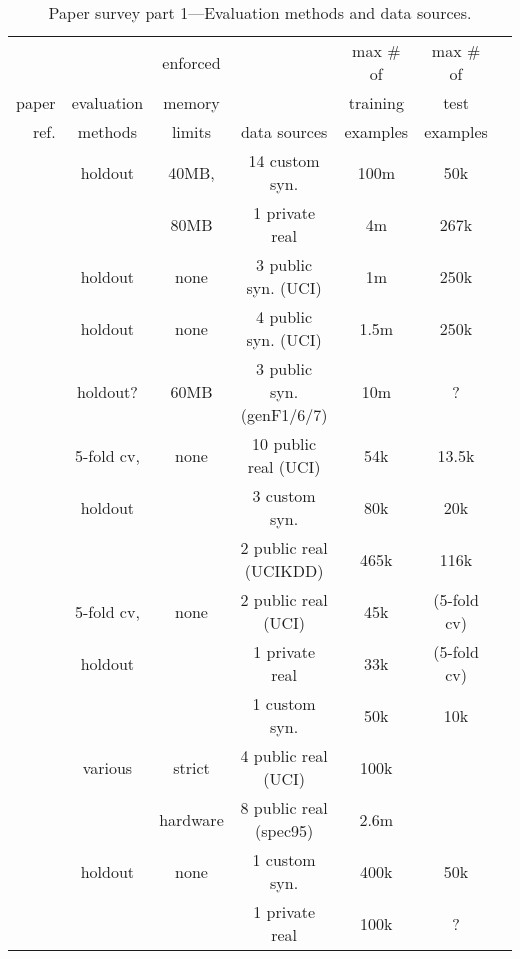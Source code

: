 \begin{table}
\caption{Paper survey part 1---Evaluation methods and data sources.}
\centering
\footnotesize
\begin{tabular}{|r|c|c|c|c|c|c|}
\hline											
	&		&	enforced	&		&	max \# of	&	max \# of	\\
paper	&	evaluation	&	memory	&		&	training	&	test	\\
ref.	&	methods	&	limits	&	data sources	&	examples	&	examples	\\
\hline											
\cite{vfdt}	&	holdout	&	40MB,	&	14 custom syn.	&	100m	&	50k	\\
	&		&	80MB	&	1 private real	&	4m	&	267k	\\
\hline											
\cite{vfdtc}	&	holdout	&	none	&	3 public syn. (UCI)	&	1m	&	250k	\\
\hline											
\cite{ufft}	&	holdout	&	none	&	4 public syn. (UCI)	&	1.5m	&	250k	\\
\hline											
\cite{nip}	&	holdout?	&	60MB	&	3 public syn. (genF1/6/7)	&	10m	&	?	\\
\hline											
\cite{ozaexp}	&	5-fold cv,	&	none	&	10 public real (UCI)	&	54k	&	13.5k	\\
	&	holdout	&		&	3 custom syn.	&	80k	&	20k	\\
	&		&		&	2 public real (UCIKDD)	&	465k	&	116k	\\
\hline											
\cite{sea}	&	5-fold cv,	&	none	&	2 public real (UCI)	&	45k	&	(5-fold cv)	\\
	&	holdout	&		&	1 private real	&	33k	&	(5-fold cv)	\\
	&		&		&	1 custom syn.	&	50k	&	10k	\\
\hline											
\cite{branchpred}	&	various	&	strict	&	4 public real (UCI)	&	100k	&		\\
	&		&	hardware	&	8 public real (spec95)	&	2.6m	&		\\
\hline											
\cite{fastlightboost}	&	holdout	&	none	&	1 custom syn.	&	400k	&	50k	\\
	&		&		&	1 private real	&	100k	&	?	\\
\hline
\end{tabular}
\label{tab:evalsurvey1}
\end{table}

